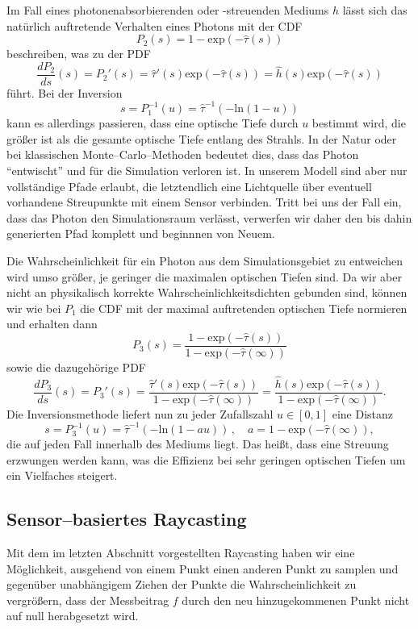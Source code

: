 	Im Fall eines photonenabsorbierenden oder -streuenden Mediums $h$ lässt sich das natürlich auftretende Verhalten eines Photons mit der CDF
	$$P_2(s)=1-\text{exp}(-{\hat \tau}(s))$$
	beschreiben, was zu der PDF
	$$\frac{dP_2}{ds}(s)=P_2'(s)={\hat \tau}'(s)\text{exp}(-{\hat \tau}(s))={\hat h}(s)\text{exp}(-{\hat \tau}(s))$$
	führt. Bei der Inversion
	$$s=P_1^{-1}(u)={\hat \tau}^{-1}\left(-\text{ln}(1-u)\right)$$
	kann es allerdings passieren, dass eine optische Tiefe durch $u$ bestimmt wird, die größer ist als die gesamte optische Tiefe entlang des Strahls. In der Natur oder bei klassischen Monte--Carlo--Methoden bedeutet dies, dass das Photon ``entwischt'' und für die Simulation verloren ist. In unserem Modell sind aber nur vollständige Pfade erlaubt, die letztendlich eine Lichtquelle über eventuell vorhandene Streupunkte mit einem Sensor verbinden. Tritt bei uns der Fall ein, dass das Photon den Simulationsraum verlässt, verwerfen wir daher den bis dahin generierten Pfad komplett und beginnnen von Neuem.
	
	Die Wahrscheinlichkeit für ein Photon aus dem Simulationsgebiet zu entweichen wird umso größer, je geringer die maximalen optischen Tiefen sind. Da wir aber nicht an physikalisch korrekte Wahrscheinlichkeitsdichten gebunden sind, können wir wie bei $P_1$ die CDF mit der maximal auftretenden optischen Tiefe normieren und erhalten dann
	$$P_3(s)=\frac{1-\text{exp}(-{\hat \tau}(s))}{1-\text{exp}(-{\hat \tau}(\infty))}$$
	sowie die dazugehörige PDF
	$$\frac{dP_3}{ds}(s)=P_3'(s)=\frac{{\hat \tau}'(s)\text{exp}(-{\hat \tau}(s))}{1-\text{exp}(-{\hat \tau}(\infty))}=\frac{{\hat h}(s)\text{exp}(-{\hat \tau}(s))}{1-\text{exp}(-{\hat \tau}(\infty))}.$$
	Die Inversionsmethode liefert nun zu jeder Zufallszahl $u\in[0,1]$ eine Distanz
	\begin{equation}
    s=P_3^{-1}(u)={\hat \tau}^{-1}\left(-\text{ln}(1-a u)\right)\,,\quad a=1-\text{exp}(-{\hat \tau}(\infty)),
    \label{eq:enforced_scattering_distancesampler}
	\end{equation}
	die auf jeden Fall innerhalb des Mediums liegt. Das heißt, dass eine Streuung erzwungen werden kann, was die Effizienz bei sehr geringen optischen Tiefen um ein Vielfaches steigert.
	
	\subsection{Sensor--basiertes Raycasting}\label{subsec:sensor_based_raycasting}
	Mit dem im letzten Abschnitt vorgestellten Raycasting haben wir eine Möglichkeit, ausgehend von einem Punkt einen anderen Punkt zu samplen und gegenüber unabhängigem Ziehen der Punkte die Wahrscheinlichkeit zu vergrößern, dass der Messbeitrag $f$ durch den neu hinzugekommenen Punkt nicht auf null herabgesetzt wird.
	
